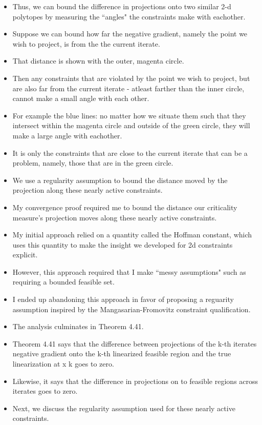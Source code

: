 \documentclass{article}
\begin{document}
\begin{itemize}
\item Thus, we can bound the difference in projections onto two similar 2-d polytopes by measuring the ``angles" the constraints make with eachother.
\item Suppose we can bound how far the negative gradient, namely the point we wish to project, is from the the current iterate.
\item That distance is shown with the outer, magenta circle.
\item Then any constraints that are violated by the point we wish to project, but are also far from the current iterate - atleast farther than the inner circle, cannot make a small angle with each other.
\item For example the blue lines: no matter how we situate them such that they intersect within the magenta circle and outside of the green circle, they will make a large angle with eachother.
\item It is only the constraints that are close to the current iterate that can be a problem, namely, those that are in the green circle.
\item We use a regularity assumption to bound the distance moved by the projection along these nearly active constraints.
\end{itemize}

\hrulefill

\begin{itemize}
\item My convergence proof required me to bound the distance our criticality measure's projection moves along these nearly active constraints.
\item My initial approach relied on a quantity called the Hoffman constant, which uses this quantity to make the insight we developed for 2d constraints explicit.
\item However, this approach required that I make ``messy assumptions" such as requiring a bounded feasible set.
\item I ended up abandoning this approach in favor of proposing a reguarity assumption inspired by the Mangasarian-Fromovitz constraint qualification.
\item The analysis culminates in Theorem 4.41.
\item Theorem 4.41 says that the difference between projections of the k-th iterates negative gradient onto the k-th linearized feasible region and the true linearization at x k goes to zero.
\item Likewise, it says that the difference in projections on to feasible regions across iterates goes to zero.
\item Next, we discuss the regularity assumption used for these nearly active constraints.
\end{itemize}
\end{document}
